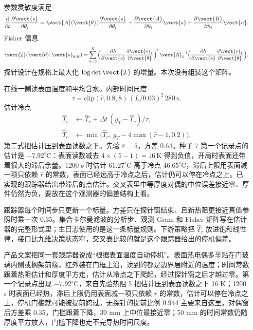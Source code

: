 参数灵敏度满足
\begin{equation}
\label{eq:sens}
\frac{\mathrm{d}}{\mathrm{d}t}\frac{\partial \vect{s}}{\partial\theta_i}
=\vect{A}(\vect{\theta})\frac{\partial \vect{s}}{\partial\theta_i}
+\frac{\partial\vect{A}}{\partial\theta_i}\vect{s}
+\frac{\partial\vect{B}}{\partial\theta_i}\vect{u}.
\end{equation}
Fisher 信息
\begin{equation}
\label{eq:fisher}
\vect{\mathcal{I}}(\vect{\theta};\vect{u}_{0:K})
=\sum_{k=0}^{K}
\Big(\frac{\partial h}{\partial \vect{s}}\frac{\partial \vect{s}_k}{\partial\vect{\theta}}\Big)^{\!\top}
\vect{R}_k^{-1}
\Big(\frac{\partial h}{\partial \vect{s}}\frac{\partial \vect{s}_k}{\partial\vect{\theta}}\Big).
\end{equation}
探针设计在规格上最大化 \(\log\det\vect{\mathcal{I}}\) 的增量。本次没有组装这个矩阵。

在线一侧读表面温度和平均含水。内部时间尺度
\[
\tau=\mathrm{clip}(\hat r,0.8,8)\,(L/0.03)^2\,280\ \mathrm{s}.
\]
估计冷点
\begin{align}
\hat T_c &\leftarrow \hat T_c+\Delta t\,(y_T-\hat T_c)/\tau,\\
\hat T_c &\leftarrow \min\big(\hat T_c,\, y_T-4\max(\hat r-1,0.2)\big).
\end{align}
第二式把估计压到表面读数之下。先验 \(\hat r=5\)，方差 \(0.64\)。种子 7 第一个记录点的估计是 \(-7.92^\circ\mathrm{C}\)：表面读数减去 \(4\times(5-1)=16\,\mathrm{K}\) 得到负值，开局时表面还带着很大的滞后余量。1200 s 时估计 \(61.27^\circ\mathrm{C}\) 高于冷点 \(46.65^\circ\mathrm{C}\)，滞后上限用表面减一项只依赖 \(\hat r\) 的常数，表面已经远高于冷点之后，估计仍可以停在冷点之上。已实现的跟踪器给出带滞后的点估计。交叉表里中等厚度对偶的中位误差接近零、厚件仍然为负，要放在这个观测器的偏差结构上看。

跟踪器每个时间步只更新一个标量。方差只在探针窗结束、且新热阻更接近真值参照时乘一次 0.35。集合卡尔曼滤波的分析步、观测 Gram 和 Fisher 矩阵写在估计器的完整形式里；主日志使用的是这一条标量规则。下游策略把 \(\hat T_c\) 放进饱和线性律，接口比九维决策状态窄，交叉表比较的就是这个跟踪器给出的停机偏差。

产品文案把同一套跟踪器说成“根据表面温度自动停机”。表面热电偶多半贴在门玻璃内侧或搁架前缘，红外装在门框上沿，读到的都是边界层附近的温度；时间常数跟着热阻估计和厚度平方走，估计从冷点之下爬起，经过探针窗之后才越过零。第一个记录点出现 \(-7.92^\circ\mathrm{C}\)，来自先验热阻 5 把估计压到表面读数之下 16 K；1200 s 时表面已经热，滞后上限仍用表面减一项只依赖 \(\hat r\) 的常数，估计可以停在冷点之上，停机门槛就可能被提前跨过。无探针的提前比例 \(0.944\) 主要来自这里。对偶窗后方差乘 0.35，门槛跟着下降，30 mm 上中位最接近零；50 mm 的时间常数仍随厚度平方放大，门槛下降也走不完导热时间尺度。

